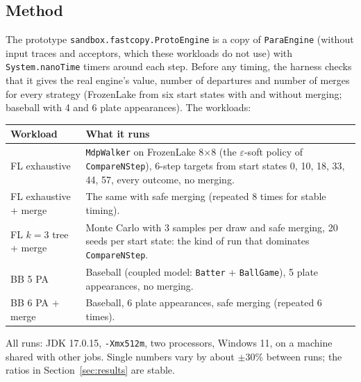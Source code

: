\documentclass[11pt]{article}
\newcommand{\code}[1]{\texttt{#1}}
\begin{document}
\subsection{Method}
The prototype \code{sandbox.fastcopy.ProtoEngine} is a copy of \code{ParaEngine} (without input traces and acceptors,
which these workloads do not use) with \code{System.nanoTime} timers around each step. Before any timing, the
harness checks that it gives the real engine's value, number of departures and number of merges for every strategy
(FrozenLake from six start states with and without merging; baseball with 4 and 6 plate appearances). The workloads:
\begin{center}\small
\begin{tabularx}{\linewidth}{@{}lY@{}}
\toprule
\textbf{Workload} & \textbf{What it runs}\\
\midrule
FL exhaustive & \code{MdpWalker} on FrozenLake 8$\times$8 (the $\varepsilon$-soft policy of \code{CompareNStep}),
  6-step targets from start states 0, 10, 18, 33, 44, 57, every outcome, no merging.\\
FL exhaustive + merge & The same with safe merging (repeated 8 times for stable timing).\\
FL $k{=}3$ tree + merge & Monte Carlo with 3 samples per draw and safe merging, 20 seeds per start state: the kind of
  run that dominates \code{CompareNStep}.\\
BB 5 PA & Baseball (coupled model: \code{Batter} + \code{BallGame}), 5 plate appearances, no merging.\\
BB 6 PA + merge & Baseball, 6 plate appearances, safe merging (repeated 6 times).\\
\bottomrule
\end{tabularx}
\end{center}
All runs: JDK 17.0.15, \code{-Xmx512m}, two processors, Windows 11, on a machine shared with other jobs. Single
numbers vary by about $\pm$30\% between runs; the ratios in Section~\ref{sec:results} are stable.
\end{document}
